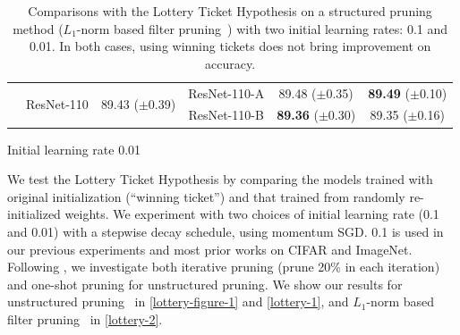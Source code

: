 \begin{table}[!htbp]
\begin{subtable}[b]{\textwidth}
\begin{tabular}{c|ccccc}
                          & \multirow{2}{*}{ResNet-110} & \multirow{2}{*}{89.43 ($\pm$0.39)} & ResNet-110-A & 89.48 ($\pm$0.35)  & \textbf{89.49} ($\pm$0.10) \\
                          &                             &                              & ResNet-110-B & \textbf{89.36} ($\pm$0.30)  & 89.35 ($\pm$0.16) \\ \hline
\end{tabular}
\vspace{2ex}
\caption{Initial learning rate 0.01}
\end{subtable}
\caption{Comparisons with the Lottery Ticket Hypothesis \citep{lottery} on a structured pruning method ($L_1$-norm based filter pruning~\citep{li2016pruning}) with two initial learning rates: 0.1 and 0.01. In both cases, using winning tickets does not bring improvement on accuracy.}
\vspace{-1.5ex}
\label{lottery-2}
\end{table}

We test the Lottery Ticket Hypothesis by comparing the models trained with original initialization (``winning ticket'') and that trained from randomly re-initialized weights. We experiment with two choices of initial learning rate (0.1 and 0.01) with a stepwise decay schedule, using momentum SGD. 0.1 is used in our previous experiments and most prior works on CIFAR and ImageNet. Following \citet{lottery}, we investigate both iterative pruning (prune 20\% in each iteration) and one-shot pruning for unstructured pruning. We show our results for unstructured  pruning~\citep{han2015learning} in \autoref{lottery-figure-1} and \autoref{lottery-1}, and $L_1$-norm based filter pruning~\citep{li2016pruning}  in \autoref{lottery-2}.



